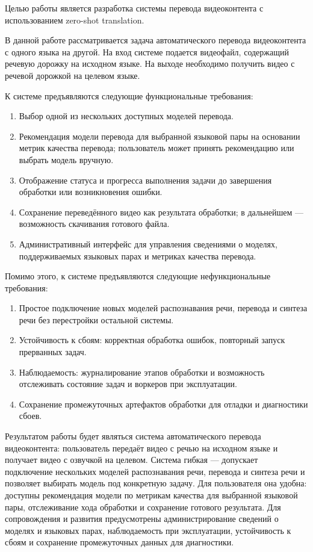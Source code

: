\documentclass[a4paper,article,14pt]{extarticle}
\begin{document}
\newpage
{}

Целью работы является разработка системы перевода видеоконтента с использованием zero-shot translation.

В данной работе рассматривается задача автоматического перевода видеоконтента с одного языка на другой. На вход системе подается видеофайл, содержащий речевую дорожку на исходном языке. На выходе необходимо получить видео с речевой дорожкой на целевом языке.

К системе предъявляются следующие функциональные требования:
\begin{enumerate}
  \item Выбор одной из нескольких доступных моделей перевода.
  \item Рекомендация модели перевода для выбранной языковой пары на основании метрик качества перевода; пользователь может принять рекомендацию или выбрать модель вручную.
  \item Отображение статуса и прогресса выполнения задачи до завершения обработки или возникновения ошибки.
  \item Сохранение переведённого видео как результата обработки; в дальнейшем --- возможность скачивания готового файла.
  \item Административный интерфейс для управления сведениями о моделях, поддерживаемых языковых парах и метриках качества перевода.
\end{enumerate}

Помимо этого, к системе предъявляются следующие нефункциональные требования:
\begin{enumerate}
  \item Простое подключение новых моделей распознавания речи, перевода и синтеза речи без перестройки остальной системы.
  \item Устойчивость к сбоям: корректная обработка ошибок, повторный запуск прерванных задач.
  \item Наблюдаемость: журналирование этапов обработки и возможность отслеживать состояние задач и воркеров при эксплуатации.
  \item Сохранение промежуточных артефактов обработки для отладки и диагностики сбоев.
\end{enumerate}

Результатом работы будет являться система автоматического перевода видеоконтента: пользователь передаёт видео с речью на исходном языке и получает видео с озвучкой на целевом. Система гибкая --- допускает подключение нескольких моделей распознавания речи, перевода и синтеза речи и позволяет выбирать модель под конкретную задачу. Для пользователя она удобна: доступны рекомендация модели по метрикам качества для выбранной языковой пары, отслеживание хода обработки и сохранение готового результата. Для сопровождения и развития предусмотрены администрирование сведений о моделях и языковых парах, наблюдаемость при эксплуатации, устойчивость к сбоям и сохранение промежуточных данных для диагностики.
\end{document}
